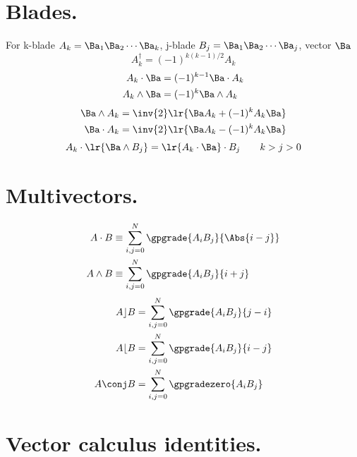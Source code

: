 \section{Blades.}
For k-blade \( A_k = \Ba_1 \Ba_2 \cdots \Ba_k \), j-blade \( B_j = \Ba_1 \Ba_2 \cdots \Ba_j \), vector \( \Ba \)
\begin{equation}\label{eqn:helpful:240}
A_k^\dagger = (-1)^{k(k-1)/2} A_k
\end{equation}
\begin{equation}\label{eqn:helpful:260}
\begin{aligned}
A_k \cdot \Ba  &= (-1)^{k-1} \Ba \cdot A_k \\
A_k \wedge \Ba &= (-1)^k \Ba \wedge A_k
\end{aligned}
\end{equation}
\begin{equation}\label{eqn:helpful:280}
\begin{aligned}
\Ba \wedge A_k &= \inv{2}\lr{ \Ba A_k + (-1)^k A_k \Ba } \\
\Ba \cdot A_k &= \inv{2}\lr{ \Ba A_k - (-1)^k A_k \Ba }
\end{aligned}
\end{equation}
\begin{equation*}
A_k \cdot \lr{ \Ba \wedge B_j } = \lr{ A_k \cdot \Ba } \cdot B_j\qquad k > j > 0
\end{equation*}

\section{Multivectors.}
\begin{equation}\label{eqn:helpful:300}
\begin{aligned}
A \cdot B &\equiv \sum_{i,j = 0}^N \gpgrade{ A_i B_j }{\Abs{i - j}} \\
A \wedge B &\equiv \sum_{i,j = 0}^N \gpgrade{ A_i B_j }{i + j}
\end{aligned}
\end{equation}
\begin{equation}\label{eqn:helpful:320}
\begin{aligned}
A \rfloor B &= \sum_{i,j = 0}^N \gpgrade{ A_i B_j }{j - i} \\
A \lfloor B &= \sum_{i,j = 0}^N \gpgrade{ A_i B_j }{i - j} \\
A \conj B &= \sum_{i,j = 0}^N \gpgradezero{ A_i B_j }
\end{aligned}
\end{equation}
\section{Vector calculus identities.}

